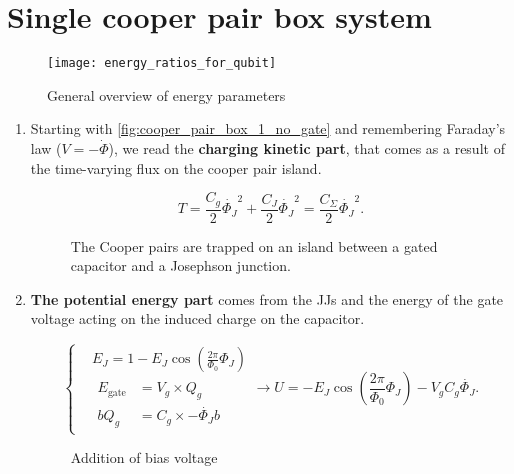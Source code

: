 \section{Single cooper pair box system\label{sec:cooper_pair_box}}
\begin{figure}[h]
  \centering \texttt{[image: energy\_ratios\_for\_qubit]}
  \caption{\small       General        overview       of       energy
    parameters\label{fig:energy_ratios_for_qubit}}
\end{figure}

\begin{enumerate}
\item   Starting  with   \autoref{fig:cooper_pair_box_1_no_gate}  and
  remembering   Faraday's  law   ($V  =   -\dot{\Phi}$),  we   read  the
  \textbf{charging  kinetic part},  that  comes as  a  result of  the
  time-varying flux on the cooper pair island.

  \begin{equation}
    T = \frac{C_g}{2}\dot{\Phi_J}^2 + \frac{C_J}{2}\dot{\Phi_J}^2 = \frac{C_\Sigma}{2}\dot{\Phi_J}^2.
  \end{equation}

  \begin{figure}[h]
    \centering {}
    \caption{\small The Cooper pairs are trapped on an island between
      a       gated       capacitor       and       a       Josephson
      junction.\label{fig:cooper_pair_box_1_no_gate}}
  \end{figure}

\item \textbf{The potential  energy part} comes from the  JJs and the
  energy of  the gate  voltage acting  on the  induced charge  on the
  capacitor.

  \begin{equation}
    \left\{
      \begin{aligned}
        & E_J = 1 - E_J\cos(\frac{2\pi}{\Phi_0}\Phi_J)\\
        &  \begin{aligned} E_\text{gate}  & =  V_g \times  Q_g\\b Q_g  & =
          C_g\times -\dot{\Phi_J}b
        \end{aligned}
      \end{aligned}\right.  \rightarrow U =
    -E_J\cos(\frac{2\pi}{\Phi_0}\Phi_J)
    -
    V_gC_g\dot{\Phi_J}.
  \end{equation}

  \begin{figure}[h]
    \centering {}
    \caption{\small            Addition            of            bias
      voltage\label{fig:cooper_pair_box_2_with_gate}}
  \end{figure}


\end{enumerate}
